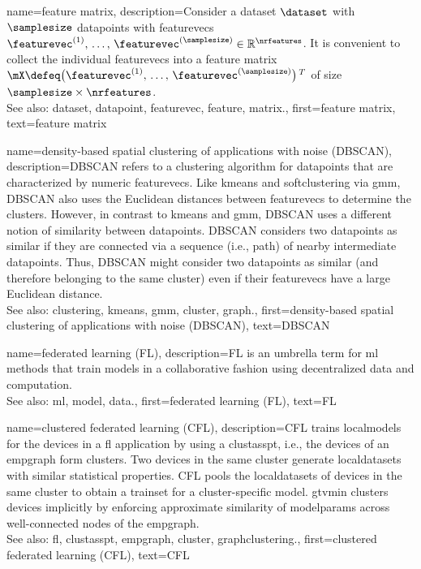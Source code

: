 {name={feature matrix}, 
	description={Consider a \gls{dataset} $\dataset$ 
		with $\samplesize$ \glspl{datapoint} with \glspl{featurevec} 
		$\featurevec^{(1)}, \,\ldots, \,\featurevec^{(\samplesize)} \in \mathbb{R}^{\nrfeatures}$. 
		It is convenient to collect the individual \glspl{featurevec} into a \gls{feature} 
		\gls{matrix} $\mX \defeq \big(\featurevec^{(1)}, \,\ldots, \,\featurevec^{(\samplesize)}\big)\,^{T}$ 
		of size $\samplesize \times \nrfeatures$.
				\\
		See also: \gls{dataset}, \gls{datapoint}, \gls{featurevec}, \gls{feature}, \gls{matrix}.},
	first={feature matrix},
	text={feature matrix} 
}

{name={density-based spatial clustering of applications with noise (DBSCAN)}, 
	description={DBSCAN 
		refers to a \gls{clustering} \gls{algorithm} for \glspl{datapoint} that are characterized by numeric \glspl{featurevec}. 
		Like \gls{kmeans} and \gls{softclustering} via \gls{gmm}, DBSCAN also uses the Euclidean 
		distances between \glspl{featurevec} to determine the \glspl{cluster}. However, in contrast to \gls{kmeans} 
		and \gls{gmm}, DBSCAN uses a different notion of similarity between \glspl{datapoint}. 
		DBSCAN considers two \glspl{datapoint} as similar if they are connected 
		via a sequence (i.e., path) of nearby intermediate \glspl{datapoint}. Thus, DBSCAN might consider 
		two \glspl{datapoint} as similar (and therefore belonging to the same cluster) even if 
		their \glspl{featurevec} have a large Euclidean distance.
				\\
		See also: \gls{clustering}, \gls{kmeans}, \gls{gmm}, \gls{cluster}, \gls{graph}.},
	first={density-based spatial clustering of applications with noise (DBSCAN)},
	text={DBSCAN} 
}

{name={federated learning (FL)}, 
	description={FL 
		is an umbrella term for \gls{ml} methods that train \glspl{model} in a collaborative 
		fashion using decentralized \gls{data} and computation.
				\\
		See also: \gls{ml}, \gls{model}, \gls{data}.},
	first={federated learning (FL)},
	text={FL} 
}
	
{name={clustered federated learning (CFL)}, 
	description={CFL trains \glspl{localmodel} for the 
 		\glspl{device} in a \gls{fl} application by using a \gls{clustasspt}, i.e., the \glspl{device} 
 		of an \gls{empgraph} form \glspl{cluster}. Two \glspl{device} in the same \gls{cluster} generate 
 		\glspl{localdataset} with similar statistical properties. CFL pools the \glspl{localdataset} of \glspl{device} 
 		in the same \gls{cluster} to obtain a \gls{trainset} for a \gls{cluster}-specific \gls{model}. 
 		\Gls{gtvmin} clusters \glspl{device} implicitly by enforcing approximate similarity of \glspl{modelparam} 
 		across well-connected nodes of the \gls{empgraph}.\\ 
 		See also: \gls{fl}, \gls{clustasspt}, \gls{empgraph}, \gls{cluster}, \gls{graphclustering}.},
	first={clustered federated learning (CFL)},
	text={CFL} 
}

